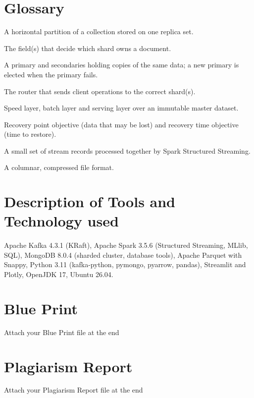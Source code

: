 \section {Glossary}
\begin{description}[noitemsep]
\item[Shard] A horizontal partition of a collection stored on one replica set.
\item[Shard key] The field(s) that decide which shard owns a document.
\item[Replica set] A primary and secondaries holding copies of the same data; a new primary is elected when the primary fails.
\item[mongos] The router that sends client operations to the correct shard(s).
\item[Lambda architecture] Speed layer, batch layer and serving layer over an immutable master dataset.
\item[RPO / RTO] Recovery point objective (data that may be lost) and recovery time objective (time to restore).
\item[Micro-batch] A small set of stream records processed together by Spark Structured Streaming.
\item[Parquet] A columnar, compressed file format.
\end{description}

\section {Description of Tools and Technology used}
\paragraph{}
Apache Kafka 4.3.1 (KRaft), Apache Spark 3.5.6 (Structured Streaming, MLlib, SQL), MongoDB 8.0.4 (sharded cluster, database tools), Apache Parquet with Snappy, Python 3.11 (kafka-python, pymongo, pyarrow, pandas), Streamlit and Plotly, OpenJDK 17, Ubuntu 26.04.

\section{Blue Print}
Attach your Blue Print file at the end

\section{Plagiarism Report}
Attach your Plagiarism Report file at the end
